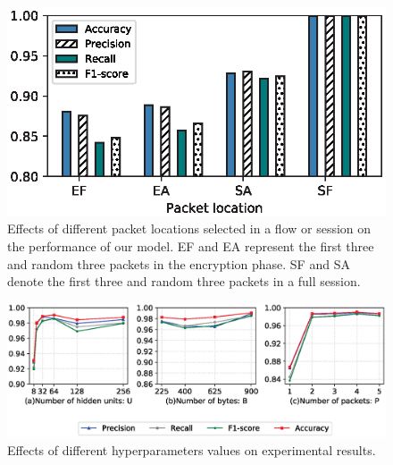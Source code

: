 \documentclass[preprint,12pt]{elsarticle}
\begin{document}
\begin{figure}[]
\centering
\includegraphics[width=\textwidth]{EF.eps}
\caption{Effects of different packet locations selected in a flow or session on the performance of our model. EF and EA represent the first three and random three packets in the encryption phase. SF and SA denote the first three and random three packets in a full session.}\label{fig7}
\end{figure}



\begin{figure}[]
\centering
\includegraphics[width=\textwidth]{hyperpara.eps}
\caption{Effects of different hyperparameters values on experimental results.}\label{fig8}
\end{figure}
\end{document}
